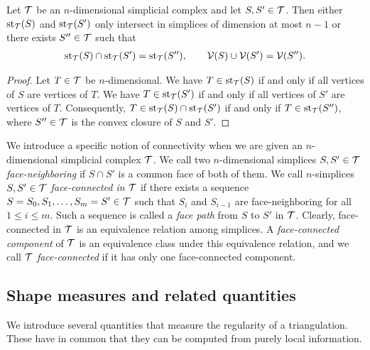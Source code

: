 \documentclass[10pt,a4paper]{article}
\begin{document}
\begin{lemma}
 Let ${\mathcal T}$ be an $n$-dimensional simplicial complex and let $S,S' \in {\mathcal T}$.
 Then either $\operatorname{st}_{{\mathcal T}}(S)$ and $\operatorname{st}_{{\mathcal T}}(S')$ 
 only intersect in simplices of dimension at most $n-1$ %
 or there exists $S'' \in {\mathcal T}$
 such that 
 \begin{align*}
    \operatorname{st}_{{\mathcal T}}(S) \cap \operatorname{st}_{{\mathcal T}}(S') = \operatorname{st}_{{\mathcal T}}(S''),
    \qquad 
    {\mathcal V}(S) \cup {\mathcal V}(S') = {\mathcal V}(S'').
 \end{align*}
\end{lemma}
\begin{proof}
 Let $T \in {\mathcal T}$ be $n$-dimensional.
 We have $T \in \operatorname{st}_{{\mathcal T}}(S )$ if and only if all vertices of $S $ are vertices of $T$.
 We have $T \in \operatorname{st}_{{\mathcal T}}(S')$ if and only if all vertices of $S'$ are vertices of $T$.
 Consequently, $T \in \operatorname{st}_{{\mathcal T}}(S) \cap \operatorname{st}_{{\mathcal T}}(S')$ if and only if $T \in \operatorname{st}_{{\mathcal T}}(S'')$,
 where $S'' \in {\mathcal T}$ is the convex closure of $S$ and $S'$.
\end{proof}

We introduce a specific notion of connectivity when we are given an $n$-dimensional simplicial complex ${\mathcal T}$. 
We call two $n$-dimensional simplices $S, S' \in {\mathcal T}$ \emph{face-neighboring} if $S \cap S'$ is a common face of both of them. 
We call $n$-simplices $S,S' \in {\mathcal T}$ \emph{face-connected in ${\mathcal T}$} if there exists a sequence $S=S_0,S_1,\dots,S_m=S' \in {\mathcal T}$ such that $S_{i}$ and $S_{i-1}$ are face-neighboring for all $1 \leq i \leq m$. 
Such a sequence is called a \emph{face path} from $S$ to $S'$ in ${\mathcal T}$. 
Clearly, face-connected in ${\mathcal T}$ is an equivalence relation among simplices. 
A \emph{face-connected component} of ${\mathcal T}$ is an equivalence class under this equivalence relation, 
and we call ${\mathcal T}$ \emph{face-connected} if it has only one face-connected component. 


\subsection{Shape measures and related quantities}

We introduce several quantities that measure the regularity of a triangulation. 
These have in common that they can be computed from purely local information. 
\end{document}
